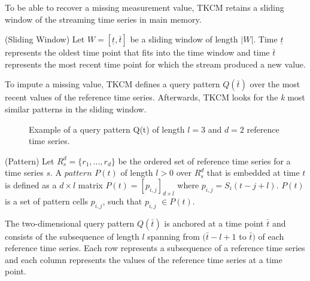 \documentclass[abstracton,12pt,oneside]{scrreprt}
\begin{document}
To be able to recover a missing measurement value, TKCM retains a sliding window of the streaming time series in main memory. 

\begin{defn}
	(Sliding Window) Let $W=[ \underline{t}, \bar{t} ]$ be a sliding window of length $|W|$. Time $\underline{t}$ represents the oldest time point that fits into the time window and time $\bar{t}$ represents the most recent time point for which the stream produced a new value. 
\end{defn}
To impute a missing value, TKCM defines a query pattern $Q(\bar{t})$ over the most recent values of the reference time series. Afterwards, TKCM looks for the \emph{k} most similar patterns in the sliding window.  
\begin{figure}[H]
	\centering
	\caption{Example of a query pattern Q(t) of length $l=3$ and $d=2$ reference time series.}
\end{figure}
\begin{defn}
	\label{pattCell}
	(Pattern) Let $R_s^d=\{r_1,...,r_d\}$ be the ordered set of reference time series for a time series $s$. A $pattern$ $P(t)$ of length $l > 0$ over $R_s^d$ that is embedded at time $t$ is defined as a $d\times l$ matrix $P(t) = [p_{i,j}]_{d\times l}$ where $p_{i,j}=S_i(t-j+l)$. $P(t)$ is a set of pattern cells $p_{i,j}$, such that $p_{i,j}$ $\in P(t)$. 
\end{defn}
The two-dimensional query pattern $Q(\bar{t})$ is anchored at a time point $\bar{t}$ and consists of the subsequence of length $l$ spanning from $(\bar{t}-l+1$ to $\bar{t})$ of each reference time series. Each row represents a subsequence of a reference time series and each column represents the values of the reference time series at a time point.\\ 
\end{document}

